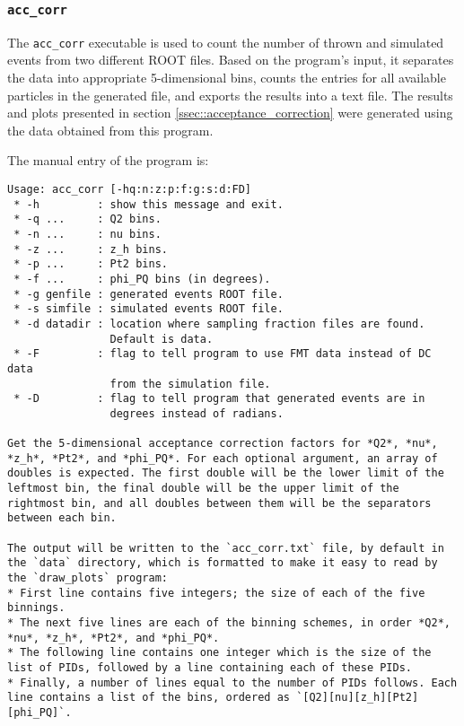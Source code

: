 \subsubsection{\texttt{acc\_corr}}
\label{sssec::acc_corr}
    The \texttt{acc\_corr} executable is used to count the number of thrown and simulated events from two different ROOT files.
    Based on the program's input, it separates the data into appropriate 5-dimensional bins, counts the entries for all available particles in the generated file, and exports the results into a text file.
    The results and plots presented in section \ref{ssec::acceptance_correction} were generated using the data obtained from this program.

    The manual entry of the program is:
    \begin{lstlisting}
Usage: acc_corr [-hq:n:z:p:f:g:s:d:FD]
 * -h         : show this message and exit.
 * -q ...     : Q2 bins.
 * -n ...     : nu bins.
 * -z ...     : z_h bins.
 * -p ...     : Pt2 bins.
 * -f ...     : phi_PQ bins (in degrees).
 * -g genfile : generated events ROOT file.
 * -s simfile : simulated events ROOT file.
 * -d datadir : location where sampling fraction files are found.
                Default is data.
 * -F         : flag to tell program to use FMT data instead of DC data
                from the simulation file.
 * -D         : flag to tell program that generated events are in
                degrees instead of radians.

Get the 5-dimensional acceptance correction factors for *Q2*, *nu*, *z_h*, *Pt2*, and *phi_PQ*. For each optional argument, an array of doubles is expected. The first double will be the lower limit of the leftmost bin, the final double will be the upper limit of the rightmost bin, and all doubles between them will be the separators between each bin.

The output will be written to the `acc_corr.txt` file, by default in the `data` directory, which is formatted to make it easy to read by the `draw_plots` program:
* First line contains five integers; the size of each of the five binnings.
* The next five lines are each of the binning schemes, in order *Q2*, *nu*, *z_h*, *Pt2*, and *phi_PQ*.
* The following line contains one integer which is the size of the list of PIDs, followed by a line containing each of these PIDs.
* Finally, a number of lines equal to the number of PIDs follows. Each line contains a list of the bins, ordered as `[Q2][nu][z_h][Pt2][phi_PQ]`.
    \end{lstlisting}
